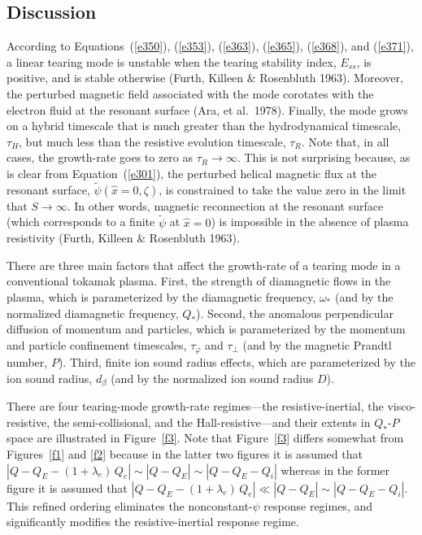 \documentclass[notitlepage,12pt]{article}
\begin{document}
\subsection{Discussion}
According to Equations~(\ref{e350}), (\ref{e353}), (\ref{e363}), (\ref{e365}), (\ref{e368}), and (\ref{e371}), a linear tearing mode is unstable when the tearing stability index, $E_{ss}$, is positive, and is stable otherwise (Furth, Killeen \& Rosenbluth 1963).
Moreover, the perturbed magnetic field associated with the mode corotates with the electron fluid at the resonant surface (Ara, et al.\ 1978). Finally,
the mode grows on a hybrid timescale that is much greater than the hydrodynamical timescale, $\tau_H$,
but much less than the resistive evolution timescale, $\tau_R$. Note that, in all cases, the growth-rate goes to zero as
$\tau_R\rightarrow \infty$. This is not surprising because, as is clear from Equation~(\ref{e301}), the perturbed
helical magnetic flux at the resonant surface,  $\tilde{\psi}(\hat{x}=0,\zeta)$, is constrained to take the value zero
in the limit that $S\rightarrow\infty$. In other words, magnetic reconnection at the resonant surface (which corresponds to a finite
$\tilde{\psi}$ at $\hat{x}=0$) is impossible in the absence of plasma resistivity (Furth, Killeen \& Rosenbluth 1963). 

There are three main factors that
affect the growth-rate of a tearing mode in a conventional tokamak plasma. First, the strength of diamagnetic flows in the plasma, which is parameterized by the
diamagnetic frequency, $\omega_\ast$ (and by the normalized diamagnetic frequency, $Q_\ast$). Second, the  anomalous perpendicular diffusion of momentum and particles, which is parameterized by the momentum and particle confinement
timescales, $\tau_\varphi$ and $\tau_\perp$ (and by the magnetic Prandtl number, $P$). Third, finite ion sound radius effects,  which are parameterized by the ion sound radius, $d_\beta$ (and by the normalized ion 
sound radius $D$).

 There are four tearing-mode growth-rate regimes---the resistive-inertial, the visco-resistive, the semi-collisional, and the Hall-resistive---and their extents in $Q_\ast$-$P$ space are illustrated in Figure~\ref{f3}.
Note that Figure~\ref{f3} differs somewhat from Figures~\ref{f1} and \ref{f2} because in the latter two
figures it is assumed that $|Q-Q_E-(1+\lambda_e)\,Q_e|\sim |Q-Q_E|\sim |Q-Q_E-Q_i|$ whereas
in the former figure it is assumed that $|Q-Q_E-(1+\lambda_e)\,Q_e|\ll |Q-Q_E|\sim |Q-Q_E-Q_i|$.
This refined ordering eliminates the nonconstant-$\psi$ response regimes, and significantly modifies the
resistive-inertial response regime. 
\end{document}
